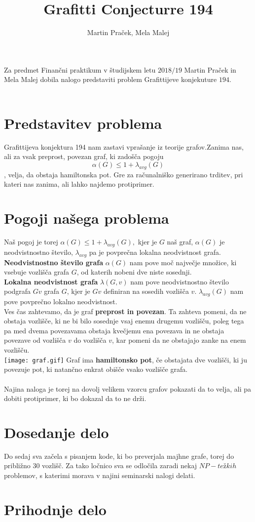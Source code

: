 \documentclass[12pt,a4paper]{amsart}
\begin{document}
\title{Grafitti Conjecturre 194}
\author{Martin Praček, Mela Malej}
\maketitle
Za predmet Finančni praktikum v študijskem letu $2018/19$ Martin Praček in Mela Malej dobila nalogo predstaviti problem Grafittijeve konjekuture $194$. \\\\
\section{Predstavitev problema}
Grafittijeva konjektura 194 nam zastavi vprašanje iz teorije grafov.Zanima nas, ali za vsak preprost, povezan graf, ki zadošča pogoju $$ \alpha(G) \leq 1 + \lambda_{avg}(G)$$, velja, da obstaja hamiltonska pot. Gre za računalniško generirano trditev, pri kateri nas zanima, ali lahko najdemo protiprimer.\\
\section{Pogoji našega problema}
Naš pogoj je torej $ \alpha(G) \leq 1 + \lambda_{avg}(G),$
kjer je $G$ naš graf, $\alpha(G)$ je neodvistnostno število, $\lambda_{avg}$ pa je povprečna lokalna neodvistnost grafa.\\
\textbf{Neodvistnostno število grafa} $\alpha(G)$ nam pove moč največje množice, ki vsebuje  vozlišča grafa $G$, od katerih nobeni dve niste sosednji.\\
\textbf{Lokalna neodvistnost grafa} $\lambda(G, v)$ nam pove neodvistnostno število podgrafa $Gv$ grafa $G$, kjer je $Gv$ definiran na sosedih vozlišča $v$. $\lambda_{avg}(G)$ nam pove povprečno lokalno neodvistnost.\\
Ves čas zahtevamo, da je graf \textbf{preprost in povezan}. Ta zahteva pomeni, da ne obstaja vozlišče, ki ne bi bilo sosednje vsaj enemu drugemu vozlišču, poleg tega pa med dvema povezavama obstaja kvečjemu ena povezava in ne obstaja  povezave od vozlišča $v$ do vozlišča $v$, kar pomeni da ne obstajajo zanke na enem vozlišču.\\
\texttt{[image: graf.gif]}
Graf ima \textbf{hamiltonsko pot}, če obstajata dve vozlišči, ki ju povezuje pot, ki natančno enkrat obišče vsako vozlišče grafa.\\
\ \\
Najina naloga je torej na dovolj velikem vzorcu grafov pokazati da to velja, ali pa dobiti protiprimer, ki bo dokazal da to ne drži.\\
\section{Dosedanje delo}
Do sedaj sva začela s pisanjem kode, ki bo preverjala majhne grafe, torej do približno $30$ vozlišč. Za tako ločnico sva se odločila zaradi nekaj $NP-težkih$ problemov, s katerimi morava v najini seminarski nalogi delati.  
\section{Prihodnje delo}
\end{document}
